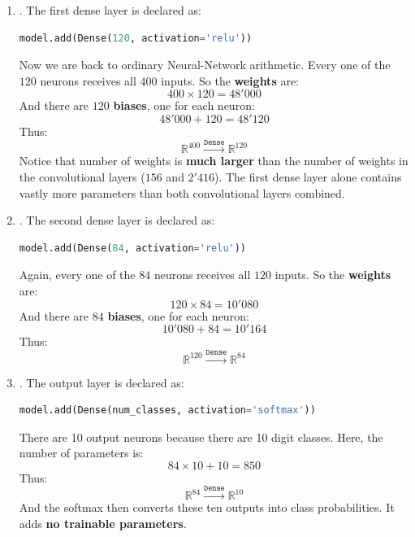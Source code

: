 \begin{enumerate}
    \item {}. The first dense layer is declared as:
    \begin{lstlisting}[language=Python]
model.add(Dense(120, activation='relu'))
\end{lstlisting}
    Now we are back to ordinary Neural-Network arithmetic. Every one of the $120$ neurons receives all $400$ inputs. So the \textbf{weights} are:
    \begin{equation*}
        400 \times 120 = 48'000
    \end{equation*}
    And there are $120$ \textbf{biases}, one for each neuron:
    \begin{equation*}
        48'000 + 120 = 48'120
    \end{equation*}
    Thus:
    \begin{equation*}
        \mathbb{R}^{400} \xrightarrow{\texttt{Dense}} \mathbb{R}^{120}
    \end{equation*}
    Notice that number of weights is \textbf{much larger} than the number of weights in the convolutional layers ($156$ and $2'416$). The first dense layer alone contains vastly more parameters than both convolutional layers combined.


    \item {}. The second dense layer is declared as:
    \begin{lstlisting}[language=Python]
model.add(Dense(84, activation='relu'))
\end{lstlisting}
    Again, every one of the $84$ neurons receives all $120$ inputs. So the \textbf{weights} are:
    \begin{equation*}
        120 \times 84 = 10'080
    \end{equation*}
    And there are $84$ \textbf{biases}, one for each neuron:
    \begin{equation*}
        10'080 + 84 = 10'164
    \end{equation*}
    Thus:
    \begin{equation*}
        \mathbb{R}^{120} \xrightarrow{\texttt{Dense}} \mathbb{R}^{84}
    \end{equation*}


    \item {}. The output layer is declared as:
    \begin{lstlisting}[language=Python]
model.add(Dense(num_classes, activation='softmax'))
\end{lstlisting}
    There are 10 output neurons because there are 10 digit classes. Here, the number of parameters is:
    \begin{equation*}
        84 \times 10 + 10 = 850
    \end{equation*}
    Thus:
    \begin{equation*}
        \mathbb{R}^{84} \xrightarrow{\texttt{Dense}} \mathbb{R}^{10}
    \end{equation*}
    And the softmax then converts these ten outputs into class probabilities. It adds \textbf{no trainable parameters}.
\end{enumerate}
